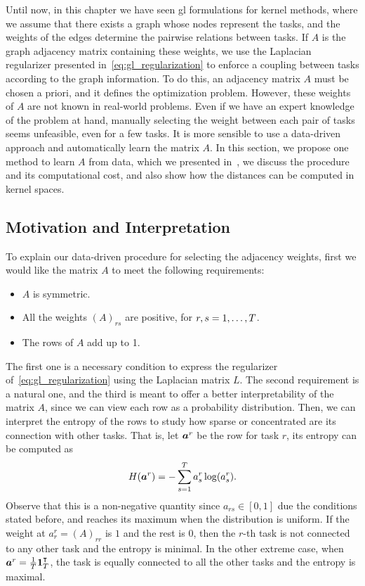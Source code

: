 Until now, in this chapter we have seen \acrshort{gl} formulations for kernel methods, where we assume that there exists a graph whose nodes represent the tasks, and the weights of the edges determine the pairwise relations between tasks.
%
If $A$ is the graph adjacency matrix containing these weights, we use the Laplacian regularizer
presented in~\eqref{eq:gl_regularization} to enforce a coupling between tasks according to the graph information.
To do this, an adjacency matrix $A$ must be chosen a priori, and it defines the optimization problem.
However, these weights of $A$ are not known in real-world problems. Even if we have an expert knowledge of the problem at hand, manually selecting the weight between each pair of tasks seems unfeasible, even for a few tasks.
It is more sensible to use a data-driven approach and automatically learn the matrix $A$.
In this section, we propose one method to learn $A$ from data, which we presented in~\citep{RuizAD21_hais}, we discuss the procedure and its computational cost, and also show how the distances can be computed in kernel spaces.

\subsection{Motivation and Interpretation}
To explain our data-driven procedure for selecting the adjacency weights, first we would like the matrix $A$ to meet the following requirements:
\begin{itemize}
    \item $A$ is symmetric.
    \item All the weights $(A)_{rs}$ are positive, for $r, s=1, \ldots, T$.
    \item The rows of $A$ add up to 1.
\end{itemize}
The first one is a necessary condition to express the regularizer of~\eqref{eq:gl_regularization} using the Laplacian matrix $L$.
The second requirement is a natural one, and the third is meant to offer a better interpretability of the matrix $A$, since we can view each row as a probability distribution.
%
Then, we can interpret the entropy of the rows to study how sparse or concentrated are its connection with other tasks. That is, let $\bm{a}^r$ be the row for task $r$, its entropy can be computed as
\begin{equation}
    \nonumber
    H(\bm{a}^r) = -\sum_{s=1}^T a^r_s \log(a^r_s).
\end{equation}
Observe that this is a non-negative quantity since $a_{rs} \in [0, 1]$ due the conditions stated before, and reaches its maximum when the distribution is uniform.
If the weight at $a^r_r = (A)_{rr}$ is $1$ and the rest is $0$, then the $r$-th task is not connected to any other task and the entropy is minimal. In the other extreme case, when $\bm{a}^r = \frac{1}{T} \bm{1}_T^\intercal$, the task is equally connected to all the other tasks and the entropy is maximal.
%

